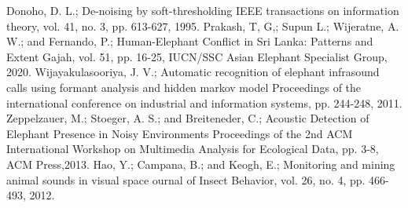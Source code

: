 \documentclass[applsci,article,accept,moreauthors,pdftex]{Definitions/mdpi}
\begin{document}
\begin{thebibliography}{999}
	Donoho, D. L.; \newblock De-noising by soft-thresholding
	\newblock IEEE transactions on information theory, vol. 41, no. 3, pp. 613-627, 1995.
	Prakash, T, G,; Supun L.; Wijeratne, A. W.; and Fernando, P.; \newblock Human-Elephant Conflict in Sri Lanka: Patterns and Extent
	\newblock Gajah, vol. 51, pp. 16-25, IUCN/SSC Asian Elephant Specialist Group, 2020.
	Wijayakulasooriya, J. V.; \newblock Automatic recognition of elephant infrasound calls using formant analysis and hidden markov model
	\newblock Proceedings of the international conference on industrial and information
	systems, pp. 244-248, 2011.
	Zeppelzauer, M.; Stoeger, A. S.; and Breiteneder, C.; \newblock Acoustic Detection of Elephant Presence in Noisy Environments
	\newblock Proceedings of the 2nd ACM International Workshop on Multimedia Analysis for Ecological Data, pp. 3-8, ACM Press,2013.
	Hao, Y.; Campana, B.; and Keogh, E.; \newblock Monitoring and mining animal sounds in visual space
	\newblock ournal of Insect Behavior, vol. 26, no. 4, pp. 466-493, 2012.
\end{thebibliography}
\end{document}
